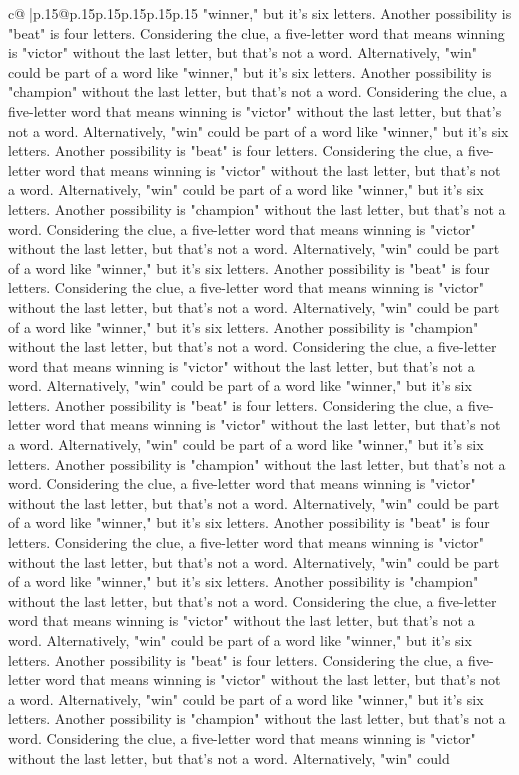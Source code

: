 \documentclass{article}
\begin{document}
{\begin{supertabular}{c@{$\;$}|p{.15\linewidth}@{}p{.15\linewidth}p{.15\linewidth}p{.15\linewidth}p{.15\linewidth}p{.15\linewidth}}
{{{"winner," but it's six letters. Another possibility is "beat" is four letters. Considering the clue, a five{-}letter word that means winning is "victor" without the last letter, but that's not a word. Alternatively, "win" could be part of a word like "winner," but it's six letters. Another possibility is "champion" without the last letter, but that's not a word. Considering the clue, a five{-}letter word that means winning is "victor" without the last letter, but that's not a word. Alternatively, "win" could be part of a word like "winner," but it's six letters. Another possibility is "beat" is four letters. Considering the clue, a five{-}letter word that means winning is "victor" without the last letter, but that's not a word. Alternatively, "win" could be part of a word like "winner," but it's six letters. Another possibility is "champion" without the last letter, but that's not a word. Considering the clue, a five{-}letter word that means winning is "victor" without the last letter, but that's not a word. Alternatively, "win" could be part of a word like "winner," but it's six letters. Another possibility is "beat" is four letters. Considering the clue, a five{-}letter word that means winning is "victor" without the last letter, but that's not a word. Alternatively, "win" could be part of a word like "winner," but it's six letters. Another possibility is "champion" without the last letter, but that's not a word. Considering the clue, a five{-}letter word that means winning is "victor" without the last letter, but that's not a word. Alternatively, "win" could be part of a word like "winner," but it's six letters. Another possibility is "beat" is four letters. Considering the clue, a five{-}letter word that means winning is "victor" without the last letter, but that's not a word. Alternatively, "win" could be part of a word like "winner," but it's six letters. Another possibility is "champion" without the last letter, but that's not a word. Considering the clue, a five{-}letter word that means winning is "victor" without the last letter, but that's not a word. Alternatively, "win" could be part of a word like "winner," but it's six letters. Another possibility is "beat" is four letters. Considering the clue, a five{-}letter word that means winning is "victor" without the last letter, but that's not a word. Alternatively, "win" could be part of a word like "winner," but it's six letters. Another possibility is "champion" without the last letter, but that's not a word. Considering the clue, a five{-}letter word that means winning is "victor" without the last letter, but that's not a word. Alternatively, "win" could be part of a word like "winner," but it's six letters. Another possibility is "beat" is four letters. Considering the clue, a five{-}letter word that means winning is "victor" without the last letter, but that's not a word. Alternatively, "win" could be part of a word like "winner," but it's six letters. Another possibility is "champion" without the last letter, but that's not a word. Considering the clue, a five{-}letter word that means winning is "victor" without the last letter, but that's not a word. Alternatively, "win" could }}}
\end{supertabular}}
\end{document}
